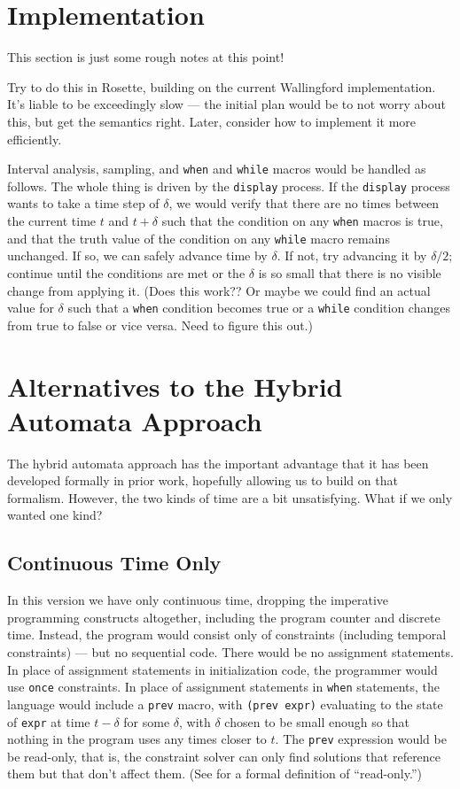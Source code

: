 \documentclass{article}
\begin{document}
\section{Implementation}

This section is just some rough notes at this point!

Try to do this in Rosette, building on the current Wallingford
implementation.  It's liable to be exceedingly slow --- the initial
plan would be to not worry about this, but get the semantics right.
Later, consider how to implement it more efficiently.

Interval analysis, sampling, and \verb|when| and \verb|while| macros
would be handled as follows.  The whole thing is driven by the
\verb|display| process.  If the \verb|display| process wants to take a
time step of $\delta$, we would verify that there are no times between
the current time $t$ and $t+\delta$ such that the condition on any
\verb|when| macros is true, and that the truth value of the condition
on any \verb|while| macro remains unchanged.  If so, we can safely
advance time by $\delta$.  If not, try advancing it by $\delta / 2$;
continue until the conditions are met or the $\delta$ is so small that
there is no visible change from applying it.  (Does this work??  Or
maybe we could find an actual value for $\delta$ such that a
\verb|when| condition becomes true or a \verb|while| condition changes
from true to false or vice versa.  Need to figure this out.)

\section{Alternatives to the Hybrid Automata Approach}

The hybrid automata approach has the important advantage that it has
been developed formally in prior work, hopefully allowing us to build
on that formalism.  However, the two kinds of time are a bit
unsatisfying.  What if we only wanted one kind?

\subsection{Continuous Time Only}

In this version we have only continuous time, dropping the imperative
programming constructs altogether, including the program counter and
discrete time.  Instead, the program would consist only of constraints
(including temporal constraints) --- but no sequential code.  There
would be no assignment statements.  In place of assignment statements
in initialization code, the programmer would use \verb|once|
constraints.  In place of assignment statements in \verb|when|
statements, the language would include a \verb|prev| macro, with
\verb|(prev expr)| evaluating to the state of \verb|expr| at time 
$t - \delta$ for some $\delta$, with $\delta$ chosen to be small
enough so that nothing in the program uses any times closer to $t$.
The \verb|prev| expression would be be read-only, that is, the
constraint solver can only find solutions that reference them but that
don't affect them.  (See \cite{borning-lisp-symbolic-computation-1992}
for a formal definition of ``read-only.'')
\end{document}
